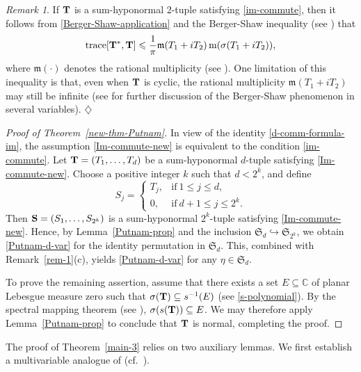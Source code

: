 \documentclass[10pt, a4paper, oneside, reqno]{amsproc}
\numberwithin{equation}{section}
\theoremstyle{remark}
\newtheorem{remark}[theorem]{Remark}
\theoremstyle{definition}
\newcommand*{\Le}{\leqslant}
\begin{document}
\begin{remark}
If ${\bf T}$ is a sum-hyponormal $2$-tuple satisfying \eqref{im-commute}, then it follows from \eqref{Berger-Shaw-application} and the Berger-Shaw inequality (see \cite[Corollary~VI.1.4]{MP1989}) that
$$\mbox{trace}[{\bf T}^*, {\bf T}] \Le \frac{1}{\pi}{\mathfrak m}(T_1+iT_2)\,{\mathrm m}(\sigma(T_1+iT_2)),$$ where ${\mathfrak m}(\cdot)$ denotes the rational multiplicity (see \cite[Definition~VI.1.1]{MP1989}). One limitation of this inequality is that, even when ${\bf T}$ is cyclic, the rational multiplicity ${\mathfrak m}(T_1+iT_2)$ may still be infinite (see \cite{DY1992, MPS2022} for further discussion of the Berger-Shaw phenomenon in several variables). \hfill $\diamondsuit$
\end{remark}
\begin{proof}[Proof of Theorem~\ref{new-thm-Putnam}]
In view of the identity \eqref{d-comm-formula-im}, 
the assumption \eqref{Im-commute-new} is equivalent to the condition \eqref{im-commute}.
Let ${\bf T}=(T_1, \ldots, T_d)$ be a sum-hyponormal $d$-tuple satisfying \eqref{Im-commute-new}. Choose a positive integer $k$ such that $d < 2^k$, and define 
\begin{equation}
\label{2k-to-general}
S_j = \begin{cases} T_j, & \mbox{if} ~1 \Le j \Le d, \\
0, & \mbox{if}~ d+1 \Le j \Le 2^k.
\end{cases}
\end{equation}
Then ${\bf S}=(S_1, \ldots, S_{2^k})$ is a sum-hyponormal $2^k$-tuple satisfying \eqref{Im-commute-new}. Hence, by Lemma~\ref{Putnam-prop} and the inclusion $\mathfrak{S}_d \hookrightarrow \mathfrak{S}_{2^k}$, we obtain \eqref{Putnam-d-var} for the identity permutation in $\mathfrak S_d$. This, combined with Remark~\ref{rem-1}(c), yields \eqref{Putnam-d-var} for any $\eta \in \mathfrak S_d$.  

To prove the remaining assertion, assume that there exists a set $E \subseteq \mathbb C$ of planar Lebesgue measure zero such that $\sigma({\bf T}) \subseteq s^{-1}(E)$
(see \eqref{s-polynomial}). By the spectral mapping theorem (see \cite[Theorem~4.8]{T1970b}), $\sigma(s({\bf T})) \subseteq E$. We may therefore apply Lemma~\ref{Putnam-prop} to conclude that ${\bf T}$ is normal, completing the proof.
\end{proof}


The proof of Theorem~\ref{main-3} relies on two auxiliary lemmas. We first establish a multivariable analogue of \cite[Corollary~1]{R1966} (cf.~\cite[Problem~236]{H1967}).
 
\end{document}
